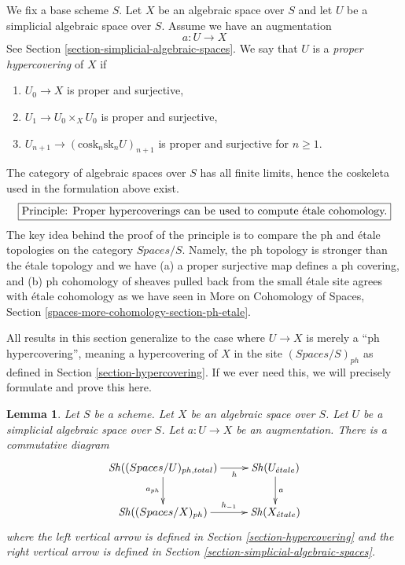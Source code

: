 \documentclass{stacks-project}
\theoremstyle{plain}
\newtheorem{lemma}[subsection]{Lemma}
\theoremstyle{definition}
\theoremstyle{remark}
\numberwithin{equation}{subsection}
\def\Sh{\mathop{\mathit{Sh}}\nolimits}
\def\etale{{\acute{e}tale}}
\begin{document}
\medskip\noindent
We fix a base scheme $S$.
Let $X$ be an algebraic space over $S$ and let $U$ be a simplicial
algebraic space over $S$. Assume we have an augmentation
$$
a : U \to X
$$
See Section \ref{section-simplicial-algebraic-spaces}.
We say that $U$ is a {\it proper hypercovering} of $X$ if
\begin{enumerate}
\item $U_0 \to X$ is proper and surjective,
\item $U_1 \to U_0 \times_X U_0$ is proper and surjective,
\item $U_{n + 1} \to (\text{cosk}_n\text{sk}_n U)_{n + 1}$
is proper and surjective for $n \geq 1$.
\end{enumerate}
The category of algebraic spaces over $S$ has all finite limits, hence the
coskeleta used in the formulation above exist.
$$
\fbox{Principle: Proper hypercoverings can be
used to compute \'etale cohomology.}
$$
The key idea behind the proof of the principle is to compare the
ph and \'etale topologies on the category $\textit{Spaces}/S$.
Namely, the ph topology is stronger than the \'etale topology and we have
(a) a proper surjective map defines a ph covering, and
(b) ph cohomology of sheaves pulled back from the small \'etale site
agrees with \'etale cohomology as we have seen in
More on Cohomology of Spaces, Section
\ref{spaces-more-cohomology-section-ph-etale}.

\medskip\noindent
All results in this section generalize to the case
where $U \to X$ is merely a ``ph hypercovering'', meaning a
hypercovering of $X$ in the site $(\textit{Spaces}/S)_{ph}$
as defined in Section \ref{section-hypercovering}. If we ever need
this, we will precisely formulate and prove this here.

\begin{lemma}
\label{lemma-compare-simplicial-objects-ph-etale}
Let $S$ be a scheme. Let $X$ be an algebraic space over $S$.
Let $U$ be a simplicial algebraic space over $S$.
Let $a : U \to X$ be an augmentation. There is a commutative diagram
$$
\xymatrix{
\Sh((\textit{Spaces}/U)_{ph, total}) \ar[r]_-h \ar[d]_{a_{ph}} &
\Sh(U_\etale) \ar[d]^a \\
\Sh((\textit{Spaces}/X)_{ph}) \ar[r]^-{h_{-1}} &
\Sh(X_\etale)
}
$$
where the left vertical arrow is defined in
Section \ref{section-hypercovering}
and the right vertical arrow is defined in
Section \ref{section-simplicial-algebraic-spaces}.
\end{lemma}
\end{document}
